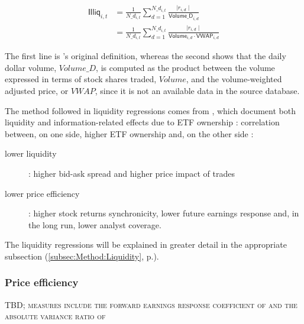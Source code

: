 \begin{equation}
  \begin{split}
    \mathsf{Illiq}_{i, t} & = \frac{1}{N\_d_{i, t}} \sum_{d = 1}^{N\_d_{i, t}} \frac{\mid r_{i, d} \mid}{\mathsf{Volume\_D}_{i, d}}\\
    &  = \frac{1}{N\_d_{i, t}} \sum_{d = 1}^{N\_d_{i, t}} \frac{\mid r_{i, d} \mid}{\mathsf{Volume}_{i, d} \cdot \mathsf{VWAP}_{i, d}}
    \end{split}
\end{equation}

  The first line is \textcite{Amihud2002}'s original definition, whereas the second shows that the daily dollar volume, $Volume\_D$, is computed as the product between the volume expressed in terms of stock shares traded, $Volume$, and the volume-weighted adjusted price, or $VWAP$, since it is not an available data in the source database.
  
The method followed in liquidity regressions comes from \textcite{Israeli2017}, which document both liquidity and information-related effects due to ETF ownership : correlation between, on one side, higher ETF ownership  and, on the other side :
\begin{description}
\item[lower liquidity] : higher bid-ask spread and higher price impact of trades
\item[lower price efficiency] : higher stock returns synchronicity, lower future earnings response and, in the long run, lower analyst coverage.
\end{description}

The liquidity regressions will be explained in greater detail in the appropriate subsection (\autoref{subsec:Method:Liquidity}, p.\pageref{subsec:Method:Liquidity}).
\subsubsection{Price efficiency}
\begin{center}
  \textsc{TBD; measures include the forward earnings response coefficient of \textcite{Israeli2017} and the absolute variance ratio of \textcite{Ben-David2018}}
  \end{center}
